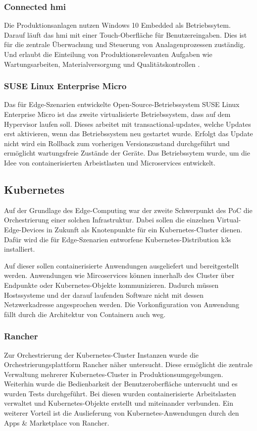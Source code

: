 \subsubsection{Connected \ac{hmi}}
Die Produktionsanlagen nutzen Windows 10 Embedded als Betriebssytem.
Darauf läuft das \acs{hmi} mit einer Touch-Oberfläche für Benutzereingaben.
Dies ist für die zentrale Überwachung und Steuerung von Analagenprozessen zuständig.
Und erlaubt die Einteilung von Produktionsrelevanten Aufgaben wie Wartungsarbeiten, Materialversorgung und Qualitätskontrollen \cite{hmi}.

\subsubsection{SUSE Linux Enterprise Micro}
Das für Edge-Szenarien entwickelte Open-Source-Betriebssystem SUSE Linux Enterprise Micro ist das zweite virtualisierte Betriebssystem, dass auf dem Hypervisor laufen soll.
Dieses arbeitet mit transactional-updates, welche Updates erst aktivieren, wenn das Betriebssystem neu gestartet wurde. 
Erfolgt das Update nicht wird ein Rollback zum vorherigen Versionszustand durchgeführt und ermöglicht wartungsfreie Zustände der Geräte.
Das Betriebssytem wurde, um die Idee von containerisierten Arbeistlasten und Microservices entwickelt.

\subsection{Kubernetes}
Auf der Grundlage des Edge-Computing war der zweite Schwerpunkt des PoC die Orchestrierung einer solchen Infrastruktur. 
Dabei sollen die einzelnen Virtual-Edge-Devices in Zukunft als Knotenpunkte für ein Kubernetes-Cluster dienen. 
Dafür wird die für Edge-Szenarien entworfene Kubernetes-Distribution k3s installiert.

Auf dieser sollen containerisierte Anwendungen ausgeliefert und bereitgestellt werden.
Anwendungen wie Mircoservices können innerhalb des Cluster über Endpunkte oder Kubernetes-Objekte kommunizieren.
Dadurch müssen Hostssysteme und der darauf laufenden Software nicht mit dessen Netzwerkadresse angesprochen werden.
Die Vorkonfiguration von Anwendung fällt durch die Architektur von Containern auch weg.



\subsubsection{Rancher}
Zur Orchestrierung der Kubernetes-Cluster Instanzen wurde die Orchestrierungsplattform Rancher näher untersucht. 
Diese ermöglicht die zentrale Verwaltung mehrerer Kubernetes-Cluster in Produktionsumgegebungen.
Weiterhin wurde die Bedienbarkeit der Benutzeroberfläche untersucht und es wurden Tests durchgeführt.
Bei diesen wurden containerisierte Arbeitslasten verwaltet und Kubernetes-Objekte erstellt und miteinander verbunden.
Ein weiterer Vorteil ist die Auslieferung von Kubernetes-Anwendungen durch den Apps \& Marketplace von Rancher. 

